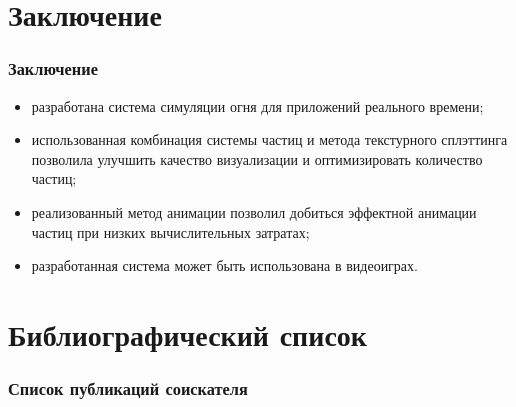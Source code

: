 \section{Заключение}
\begin{frame}
\frametitle{Заключение}
\begin{itemize}
    \item разработана система симуляции огня для приложений реального времени;
    \item использованная комбинация системы частиц и метода текстурного
        сплэттинга позволила улучшить качество визуализации и оптимизировать
        количество частиц;
    \item реализованный метод анимации позволил добиться эффектной анимации
        частиц при низких вычислительных затратах;
    \item разработанная система может быть использована в видеоиграх.
\end{itemize}
\end{frame}

\section{Библиографический список}
\begin{frame}[t,allowframebreaks]
\frametitle{Список публикаций соискателя}
\nocite{*}
\sloppy\printbibliography[
    category=AuthorSources,
    heading=none,
    resetnumbers,
]
\end{frame}

